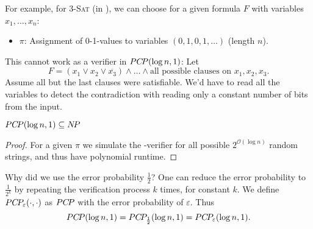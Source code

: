 \documentclass[../skript.tex]{subfiles}
\begin{document}
For example, for \textsc{3-Sat} (in \NP), we can choose for a given formula $F$ with variables $x_1, \ldots, x_n$:
\begin{itemize}
\item $\pi$: Assignment of 0-1-values to variables $(0, 1, 0, 1, \ldots)$ (length $n$).
\end{itemize}
This cannot work as a verifier in $PC \! P(\log n, 1)$: Let
\[
	F = (x_1 \vee x_2 \vee \overline{x_3}) \wedge \ldots \wedge \text{all possible clauses on $x_1, x_2, x_3$}.
\]
Assume all but the last clauses were satisfiable. We'd have to read all the variables to detect the contradiction with reading only a constant number of bits from the input.
\begin{theorem} %
\label{thm:101}
$PC \! P(\log n, 1) \subseteq N \! P$
\end{theorem}
\begin{proof}
For a given $\pi$ we simulate the \PCP-verifier for all possible $2^{\mathcal{O}(\log n)}$ random strings, and thus have polynomial runtime.
\end{proof}
Why did we use the error probability $\frac{1}{2}$? One can reduce the error probability to $\frac{1}{2^k}$ by repeating the verification process $k$ times, for constant $k$.
We define $PC \! P_\varepsilon(\cdot, \cdot)$ as $PC \! P$ with the error probability of $\varepsilon$. Thus
\[
	PC \! P(\log n, 1) = PC \! P_{\frac{1}{2}}(\log n, 1) = PC \! P_\varepsilon(\log n, 1).
\]
\end{document}
